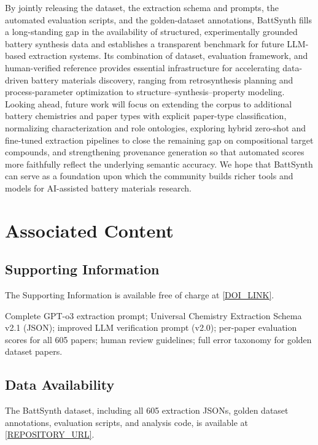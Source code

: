 \documentclass[12pt,a4paper]{article}
\begin{document}
By jointly releasing the dataset, the extraction schema and prompts, the automated evaluation scripts, and the golden-dataset annotations, BattSynth fills a long-standing gap in the availability of structured, experimentally grounded battery synthesis data and establishes a transparent benchmark for future LLM-based extraction systems. Its combination of dataset, evaluation framework, and human-verified reference provides essential infrastructure for accelerating data-driven battery materials discovery, ranging from retrosynthesis planning and process-parameter optimization to structure--synthesis--property modeling. Looking ahead, future work will focus on extending the corpus to additional battery chemistries and paper types with explicit paper-type classification, normalizing characterization and role ontologies, exploring hybrid zero-shot and fine-tuned extraction pipelines to close the remaining gap on compositional target compounds, and strengthening provenance generation so that automated scores more faithfully reflect the underlying semantic accuracy. We hope that BattSynth can serve as a foundation upon which the community builds richer tools and models for AI-assisted battery materials research.

\section*{Associated Content}

\subsection*{Supporting Information}
The Supporting Information is available free of charge at \url{[DOI_LINK]}.

Complete GPT-o3 extraction prompt; Universal Chemistry Extraction Schema v2.1 (JSON); improved LLM verification prompt (v2.0); per-paper evaluation scores for all 605 papers; human review guidelines; full error taxonomy for golden dataset papers.

\subsection*{Data Availability}
The BattSynth dataset, including all 605 extraction JSONs, golden dataset annotations, evaluation scripts, and analysis code, is available at \url{[REPOSITORY_URL]}.
\end{document}
